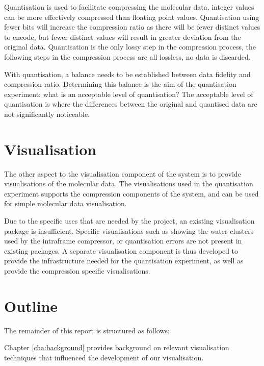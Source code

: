 Quantisation is used to facilitate compressing the molecular data, integer
values can be more effectively compressed than floating point values.
Quantisation using fewer bits will increase the compression ratio as there will
be fewer distinct values to encode, but fewer distinct values will result in
greater deviation from the original data. Quantisation is the only lossy step
in the compression process, the following steps in the compression process are
all lossless, no data is discarded.

With quantisation, a balance needs to be established between data fidelity and
compression ratio. Determining this balance is the aim of the quantisation
experiment: what is an acceptable level of quantisation? The acceptable level
of quantisation is where the differences between the original and quantised
data are not significantly noticeable.


\section{Visualisation}
\label{sec:introduction_visualisation}

The other aspect to the visualisation component of the system is to provide
visualisations of the molecular data. The visualisations used in the
quantisation experiment supports the compression components of the system, and
can be used for simple molecular data visualisation.

Due to the specific uses that are needed by the project, an existing
visualisation package is insufficient. Specific visualisations such as showing
the water clusters used by the intraframe compressor, or quantisation errors
are not present in existing packages. A separate visualisation component is
thus developed to provide the infrastructure needed for the quantisation
experiment, as well as provide the compression specific visualisations.


\section{Outline}
\label{sec:introduction_outline}

The remainder of this report is structured as follows:

Chapter \ref{cha:background} provides background on relevant visualisation
techniques that influenced the development of our visualisation.

